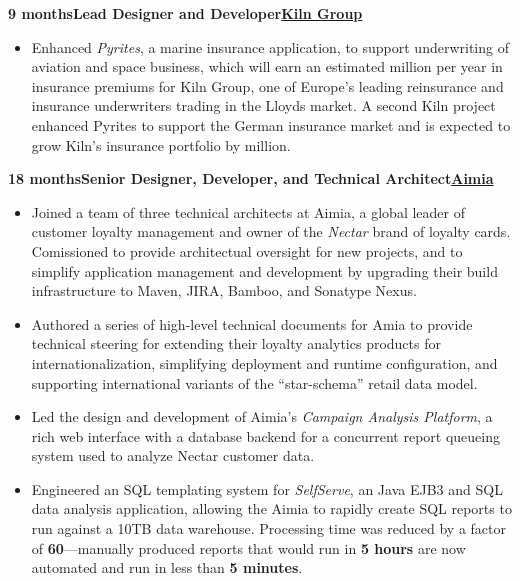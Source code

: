 \documentclass[a4paper,12pt]{article}
\newcommand{\clientwork}[3]{\textbf{#1\hfill#3\hfill#2}\nopagebreak}
\begin{document}
\clientwork{9 months}{\href{http://kilngroup.com/}{Kiln Group}}{Lead Designer and Developer}

\begin{itemize}

\item Enhanced \emph{Pyrites}, a marine insurance application, to support underwriting of aviation and space business, which will earn an estimated  million per year in insurance premiums for Kiln Group, one of Europe's leading reinsurance and insurance underwriters trading in the Lloyds market. A second Kiln project enhanced Pyrites to support the German insurance market and is expected to grow  Kiln's insurance portfolio by  million.

\end{itemize}

\clientwork{18 months}{\href{http://www.aimia.com/}{Aimia}}{Senior Designer, Developer, and Technical Architect}

\begin{itemize}

\item Joined a team of three technical architects at Aimia, a global leader of customer loyalty management and owner of the \emph{Nectar} brand of loyalty cards.  Comissioned to provide architectual oversight for new projects, and to simplify application management and development by upgrading their build infrastructure to Maven, JIRA, Bamboo, and Sonatype Nexus.

\item Authored a series of high-level technical documents for Amia to provide technical steering for extending their loyalty analytics products for internationalization, simplifying deployment and runtime configuration, and supporting international variants of the ``star-schema'' retail data model.  

\item Led the design and development of Aimia's \emph{Campaign Analysis Platform}, a rich web interface with a database backend for a concurrent report queueing system used to analyze Nectar customer data.

\item Engineered an SQL templating system for \emph{SelfServe}, an Java EJB3 and SQL data analysis application, allowing the Aimia to rapidly create SQL reports to run against a 10TB data warehouse.  Processing time was reduced by a factor of \textbf{60}---manually produced reports that would run in \textbf{5 hours} are now automated and run in less than \textbf{5 minutes}.

\end{itemize}
\end{document}
